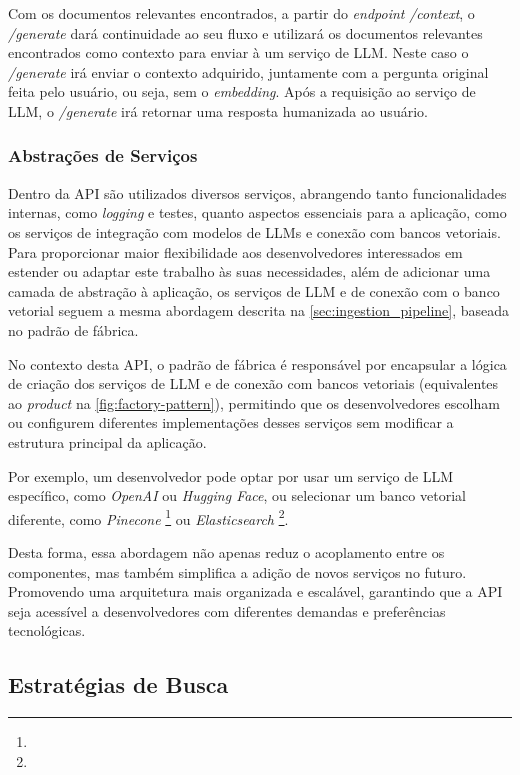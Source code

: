 \documentclass[a4paper, 12pt]{article}
\begin{document}
    Com os documentos relevantes encontrados, a partir do \textit{endpoint} \textit{/context}, o \textit{/generate} dará continuidade ao seu fluxo e utilizará os documentos relevantes encontrados como contexto para enviar à um serviço de LLM. Neste caso o \textit{/generate} irá enviar o contexto adquirido, juntamente com a pergunta original feita pelo usuário, ou seja, sem o \textit{embedding}. Após a requisição ao serviço de LLM, o \textit{/generate} irá retornar uma resposta humanizada ao usuário.

    \subsubsection{Abstrações de Serviços} \label{sec:abstraction}

    Dentro da API são utilizados diversos serviços, abrangendo tanto funcionalidades internas, como \textit{logging} e testes, quanto aspectos essenciais para a aplicação, como os serviços de integração com modelos de LLMs e conexão com bancos vetoriais. Para proporcionar maior flexibilidade aos desenvolvedores interessados em estender ou adaptar este trabalho às suas necessidades, além de adicionar uma camada de abstração à aplicação, os serviços de LLM e de conexão com o banco vetorial seguem a mesma abordagem descrita na \autoref{sec:ingestion_pipeline}, baseada no padrão de fábrica.

    No contexto desta API, o padrão de fábrica é responsável por encapsular a lógica de criação dos serviços de LLM e de conexão com bancos vetoriais (equivalentes ao \textit{product} na \autoref{fig:factory-pattern}), permitindo que os desenvolvedores escolham ou configurem diferentes implementações desses serviços sem modificar a estrutura principal da aplicação. 
    
    Por exemplo, um desenvolvedor pode optar por usar um serviço de LLM específico, como \textit{OpenAI} ou \textit{Hugging Face}, ou selecionar um banco vetorial diferente, como \textit{Pinecone} \footnote{} ou \textit{Elasticsearch} \footnote{}.
    
    Desta forma, essa abordagem não apenas reduz o acoplamento entre os componentes, mas também simplifica a adição de novos serviços no futuro. Promovendo uma arquitetura mais organizada e escalável, garantindo que a API seja acessível a desenvolvedores com diferentes demandas e preferências tecnológicas.

    \subsection{Estratégias de Busca} \label{sec:strategies}
\end{document}
